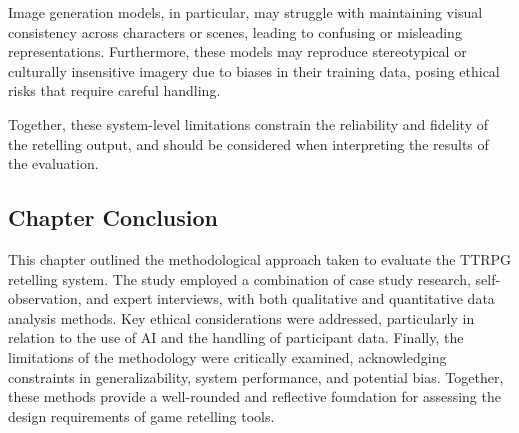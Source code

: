 Image generation models, in particular, may struggle with maintaining visual consistency across characters or scenes, leading to confusing or misleading representations. Furthermore, these models may reproduce stereotypical or culturally insensitive imagery due to biases in their training data, posing ethical risks that require careful handling.

Together, these system-level limitations constrain the reliability and fidelity of the retelling output, and should be considered when interpreting the results of the evaluation.

\subsection*{Chapter Conclusion}
This chapter outlined the methodological approach taken to evaluate the TTRPG retelling system. The study employed a combination of case study research, self-observation, and expert interviews, with both qualitative and quantitative data analysis methods. Key ethical considerations were addressed, particularly in relation to the use of AI and the handling of participant data. Finally, the limitations of the methodology were critically examined, acknowledging constraints in generalizability, system performance, and potential bias. Together, these methods provide a well-rounded and reflective foundation for assessing the design requirements of game retelling tools.